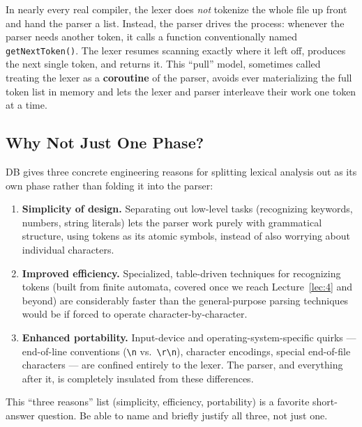 \documentclass[full-course-notes.tex]{subfiles}
\begin{document}
\begin{coreidea}
In nearly every real compiler, the lexer does \emph{not} tokenize the whole file up front and
hand the parser a list. Instead, the parser drives the process: whenever the parser needs another
token, it calls a function conventionally named \texttt{getNextToken()}. The lexer resumes
scanning exactly where it left off, produces the next single token, and returns it. This
``pull'' model, sometimes called treating the lexer as a \textbf{coroutine} of the parser, avoids
ever materializing the full token list in memory and lets the lexer and parser interleave their
work one token at a time.
\end{coreidea}

\subsection{Why Not Just One Phase?}
\label{sec:l3-why-separate}

\dbtag DB gives three concrete engineering reasons for splitting lexical analysis out as its own
phase rather than folding it into the parser:

\begin{enumerate}
  \item \textbf{Simplicity of design.} Separating out low-level tasks (recognizing keywords,
  numbers, string literals) lets the parser work purely with grammatical structure, using
  tokens as its atomic symbols, instead of also worrying about individual characters.
  \item \textbf{Improved efficiency.} Specialized, table-driven techniques for recognizing
  tokens (built from finite automata, covered once we reach Lecture~\ref{lec:4} and beyond) are
  considerably faster than the general-purpose parsing techniques would be if forced to operate
  character-by-character.
  \item \textbf{Enhanced portability.} Input-device and operating-system-specific quirks ---
  end-of-line conventions (\texttt{\textbackslash n} vs.\ \texttt{\textbackslash r\textbackslash n}), character
  encodings, special end-of-file characters --- are confined entirely to the lexer. The parser,
  and everything after it, is completely insulated from these differences.
\end{enumerate}

\begin{examfocus}
This ``three reasons'' list (simplicity, efficiency, portability) is a favorite short-answer
question. Be able to name and briefly justify all three, not just one.
\end{examfocus}
\end{document}
